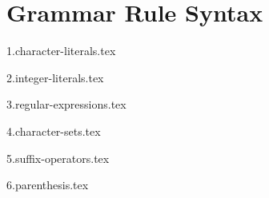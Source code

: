 
\section{Grammar Rule Syntax}
{
	\lipsum[1]
	
	{1.character-literals.tex}
	
	{2.integer-literals.tex}
	
	{3.regular-expressions.tex}
	
	{4.character-sets.tex}
	
	{5.suffix-operators.tex}
	
	{6.parenthesis.tex}
}


